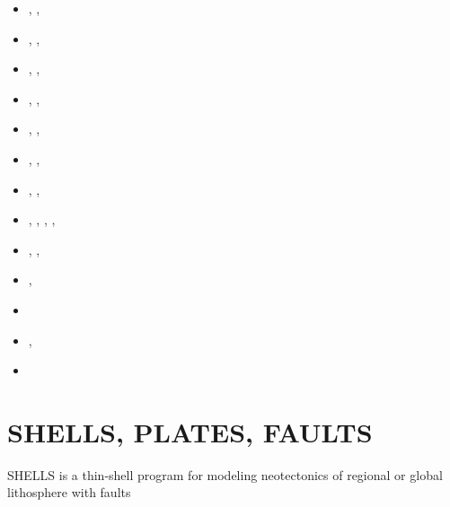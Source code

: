 \begin{small}
\begin{itemize}
                               \textcite{vady10},  \textcite{vayb10}
\item[\twothousandeleven]      \textcite{vahs11},  \textcite{java11},  \textcite{vayj11}
\item[\twothousandtwelve]      \textcite{beva12},  
                               \textcite{chgv12}, \textcite{vakn12}
\item[\twothousandthirteen]    \textcite{ancv13},  \textcite{cibi13},  \textcite{bova13}
\item[\twothousandfourteen]    \textcite{chsg14},  \textcite{mova14},  \textcite{chsv14}
\item[\twothousandfifteen]     \textcite{vasy15},  \textcite{cibi15},  \textcite{mori15}
\item[\twothousandseventeen]   \textcite{civj17},  \textcite{wewv17},  \textcite{mova17}
\item[\twothousandeighteen]    \textcite{spcv18},  \textcite{chss18},  \textcite{mova18}
\item[\twothousandnineteen]    \textcite{zhdv19},  \textcite{vayu19},  \textcite{casv19}, 
                               \textcite{vaws19},  \textcite{cibi19}
\item[\twothousandtwenty]      \textcite{moku20},  \textcite{jomv20},  \textcite{bicc20}
\item[\twothousandtwentyone]   \textcite{pocv21},  \textcite{mota21}
\item[\twothousandtwentythree] \textcite{pocb23}
\item[\twothousandtwentyfour]  \textcite{vapc24},  \textcite{mori24}
\item[\twothousandtwentyfive]  \textcite{mori25}
\end{itemize}
\end{small}


\section{SHELLS, PLATES, FAULTS} 

SHELLS is a thin-shell program for modeling neotectonics of
regional or global lithosphere with faults


